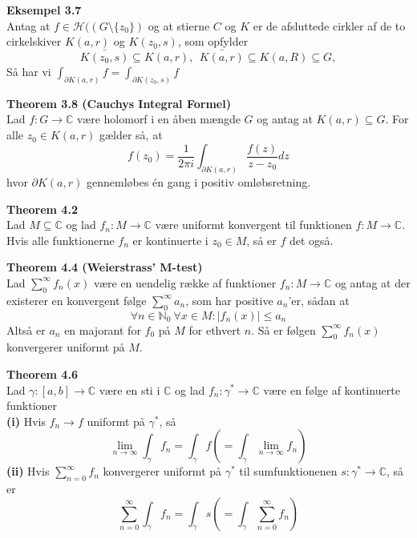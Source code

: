 \documentclass[10pt,a4paper]{article}
\theoremstyle{definition}
\begin{document}
\begin{framed}
\textbf{Eksempel 3.7} \\
Antag at $f \in \mathcal{H}((G \setminus \{z_0\})$ og at stierne $C$ og $K$ er de afsluttede cirkler af de to cirkelskiver $K(a,r)$ og $K(z_0,s)$, som opfylder $$\bar{K(z_0,s)} \subseteq K(a,r), \ \ \bar{K(a,r)} \subseteq K(a,R) \subseteq G,$$
Så har vi
$ \int_{\partial K(a,r)} f = \int_{\partial K(z_0,s)} f$
\end{framed}

\begin{framed}
\textbf{Theorem 3.8 (Cauchys Integral Formel)} \\
Lad $f: G \rightarrow \mathbb{C}$ være holomorf i en åben mængde $G$ og antag at $K(a,r) \subseteq G$. For alle $z_0 \in K(a,r)$ gælder så, at
$$ f(z_0) = \frac{1}{2 \pi i} \int_{\partial K(a,r)} \frac{f(z)}{z-z_0}dz$$
hvor $\partial K(a,r)$ gennemløbes én gang i positiv omløbsretning.
\end{framed}

\begin{framed}
\textbf{Theorem 4.2} \\
Lad $M \subseteq \mathbb{C}$ og lad $f_n : M \rightarrow \mathbb{C}$ være uniformt konvergent til funktionen $f : M \rightarrow \mathbb{C}$. \\
Hvis alle funktionerne $f_n$ er kontinuerte i $z_0 \in M$, så er $f$ det også.
\end{framed}

\begin{framed}
\textbf{Theorem 4.4 (Weierstrass' M-test)} \\
Lad $\sum_0^\infty f_n(x)$ være en uendelig række af funktioner $f_n : M \rightarrow \mathbb{C}$ og antag at der existerer en konvergent følge $\sum_0^\infty a_n$, som har positive $a_n$'er, sådan at
$$ \forall n \in \mathbb{N}_0 \ \forall x \in M : \left| f_n(x) \right| \leq a_n $$
Altså er $a_n$ en majorant for $f_0$ på $M$ for ethvert $n$. Så er følgen $\sum_0^\infty f_n (x)$ konvergerer uniformt på $M$.
\end{framed}

\begin{framed}
\textbf{Theorem 4.6} \\
Lad $\gamma : [a,b] \rightarrow \mathbb{C}$ være en sti i $\mathbb{C}$ og lad $f_n : \gamma^* \rightarrow \mathbb{C}$ være en følge af kontinuerte funktioner \\
\textbf{(i)} Hvis $f_n \rightarrow f$ uniformt på $\gamma^*$, så
$$ \lim_{n \rightarrow \infty} \int_\gamma f_n = \int_\gamma f \left(= \int_\gamma \lim_{n \rightarrow \infty} f_n \right) $$
\textbf{(ii)} Hvis $\sum_{n=0}^\infty f_n$ konvergerer uniformt på $\gamma^*$ til sumfunktionenen $s : \gamma^* \rightarrow \mathbb{C}$, så er
$$ \sum_{n=0}^\infty \int_\gamma f_n = \int_\gamma s \left( = \int_\gamma \sum_{n=0}^\infty f_n \right)$$
\end{framed}
\end{document}
